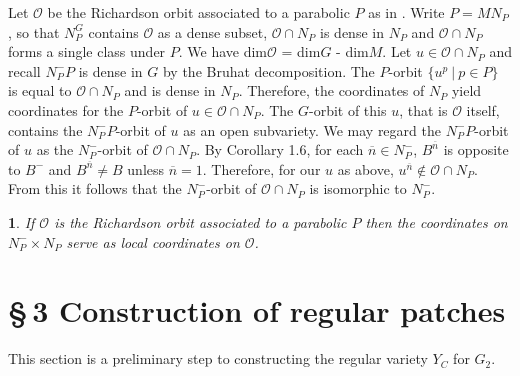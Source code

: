 \documentclass[12pt,letterpaper]{amsart}
\newcommand{\proclaimname}{}
\newtheorem*{proclaimx}{\proclaimname}
\newenvironment{proclaim}[1]%
  {\renewcommand{\proclaimname}{#1}\begin{proclaimx}}{\end{proclaimx}}
\begin{document}
Let ${\mathcal O}$ be the Richardson orbit associated to a parabolic $P$
as in \cite[Theorem 2, \S 3.9]{St74}. Write $P=MN_P$, so that $N_P^G$
contains ${\mathcal O}$ as a dense subset, ${\mathcal O}\cap N_P$ is dense in
$N_P$ and ${\mathcal O}\cap N_P$ forms a single class under $P$. We have
dim${\mathcal O}$ = dim$G$ - dim$M$. Let $u\in {\mathcal O}\cap N_P$ and recall
$N_P^- P$ is dense in $G$ by the Bruhat decomposition. The $P$-orbit
$\{u^p\ |\ p\in P\}$ is equal to ${\mathcal O}\cap N_P$ and is dense in $N_P$.
Therefore, the coordinates of $N_P$ yield coordinates for the $P$-orbit
of $u\in {\mathcal O}\cap N_P$. The $G$-orbit of this $u$, that is
${\mathcal O}$ itself, contains the $N_P^- P$-orbit of $u$ as an open
subvariety. We may regard the $N_P^- P$-orbit of $u$ as the
$N_P^-$-orbit of ${\mathcal O}\cap N_P$. By Corollary 1.6, for each
$\overline{n}\in N_P^-$, $B^{\overline{n}}$ is opposite to
$B^-$ and $B^{\overline{n}}\not= B$ unless $\overline{n}=1$.
Therefore, for our $u$ as above, $u^{\overline{n}}\notin {\mathcal O}\cap N_P$.
From this it follows that the $N_P^-$-orbit of ${\mathcal O}\cap N_P$
is isomorphic to $N_P^-$.

\begin{proclaim}{Lemma 1.21} If ${\mathcal O}$ is the Richardson orbit associated to a
parabolic $P$ then the coordinates on $N_P^- \times N_P$ serve as local
coordinates on ${\mathcal O}$.
\end{proclaim}
\fi
\section*{\S\,3 Construction of regular patches}

This section is a preliminary step to constructing the regular
variety $Y_C$ for $G_2$.
\end{document}
